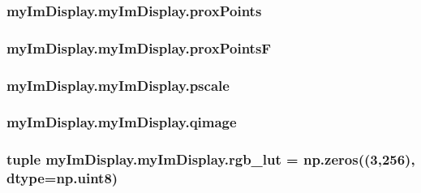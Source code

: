 \hypertarget{classmy_im_display_1_1my_im_display_acc86c3f609b093d1dab093d5d458db1c}{
\subsubsection[{prox\-Points}]{\setlength{\rightskip}{0pt plus 5cm}my\-Im\-Display.\-my\-Im\-Display.\-prox\-Points}}\label{classmy_im_display_1_1my_im_display_acc86c3f609b093d1dab093d5d458db1c}
\hypertarget{classmy_im_display_1_1my_im_display_aa0bc29d37aa4ceea5a1b6e73bb1b5b2a}{
\subsubsection[{prox\-Points\-F}]{\setlength{\rightskip}{0pt plus 5cm}my\-Im\-Display.\-my\-Im\-Display.\-prox\-Points\-F}}\label{classmy_im_display_1_1my_im_display_aa0bc29d37aa4ceea5a1b6e73bb1b5b2a}
\hypertarget{classmy_im_display_1_1my_im_display_a0a4c2d42cb88a1ffcc46de46f97298df}{
\subsubsection[{pscale}]{\setlength{\rightskip}{0pt plus 5cm}my\-Im\-Display.\-my\-Im\-Display.\-pscale}}\label{classmy_im_display_1_1my_im_display_a0a4c2d42cb88a1ffcc46de46f97298df}
\hypertarget{classmy_im_display_1_1my_im_display_a4aaf1f57b9b82bc1fc8baa8bbb178222}{
\subsubsection[{qimage}]{\setlength{\rightskip}{0pt plus 5cm}my\-Im\-Display.\-my\-Im\-Display.\-qimage}}\label{classmy_im_display_1_1my_im_display_a4aaf1f57b9b82bc1fc8baa8bbb178222}
\hypertarget{classmy_im_display_1_1my_im_display_a4816a3cbcfb5ef0d5576395ee6c95c59}{
\subsubsection[{rgb\-\_\-lut}]{\setlength{\rightskip}{0pt plus 5cm}tuple my\-Im\-Display.\-my\-Im\-Display.\-rgb\-\_\-lut = np.\-zeros((3,256), dtype=np.\-uint8)\hspace{0.3cm}{\ttfamily [static]}}}\label{classmy_im_display_1_1my_im_display_a4816a3cbcfb5ef0d5576395ee6c95c59}
